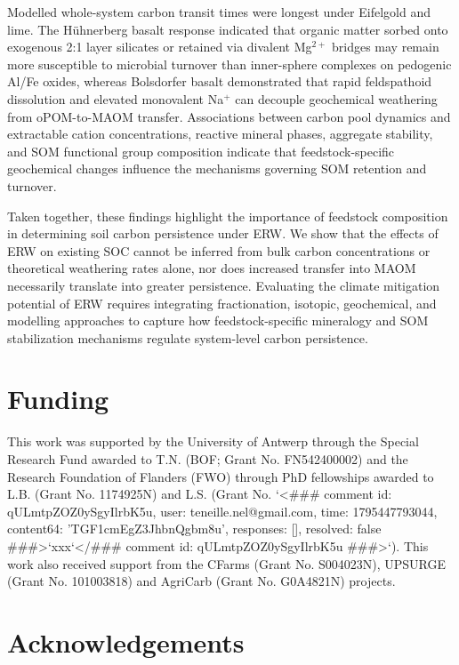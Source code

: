\documentclass[preprint,12pt]{elsarticle}
\begin{document}
Modelled whole-system carbon transit times were longest under Eifelgold and lime. The H\"uhnerberg basalt response indicated that organic matter sorbed onto exogenous 2:1 layer silicates or retained via divalent Mg$^{2+}$ bridges may remain more susceptible to microbial turnover than inner-sphere complexes on pedogenic Al/Fe oxides, whereas Bolsdorfer basalt demonstrated that rapid feldspathoid dissolution and elevated monovalent Na$^{+}$ can decouple geochemical weathering from oPOM-to-MAOM transfer. Associations between carbon pool dynamics and extractable cation concentrations, reactive mineral phases, aggregate stability, and SOM functional group composition indicate that feedstock-specific geochemical changes influence the mechanisms governing SOM retention and turnover.
  
Taken together, these findings highlight the importance of feedstock composition in determining soil carbon persistence under ERW. We show that the effects of ERW on existing SOC cannot be inferred from bulk carbon concentrations or theoretical weathering rates alone, nor does increased transfer into MAOM necessarily translate into greater persistence. Evaluating the climate mitigation potential of ERW requires integrating fractionation, isotopic, geochemical, and modelling approaches to capture how feedstock-specific mineralogy and SOM stabilization mechanisms regulate system-level carbon persistence.




\section*{Funding}
This work was supported by the University of Antwerp through the Special Research Fund  awarded to T.N. (BOF; Grant No. FN542400002) and the Research Foundation of Flanders (FWO) through PhD fellowships awarded to L.B. (Grant No. 1174925N) and L.S. (Grant No. `<### comment id: qULmtpZOZ0ySgyIlrbK5u, user: teneille.nel@gmail.com, time: 1795447793044, content64: 'TGF1cmEgZ3JhbnQgbm8u', responses: [], resolved: false ###>`xxx`</### comment id: qULmtpZOZ0ySgyIlrbK5u ###>`). This work also received support from the C\-Farms (Grant No. S004023N), UPSURGE (Grant No. 101003818) and AgriCarb (Grant No. G0A4821N) projects.

\section*{Acknowledgements}
\end{document}
